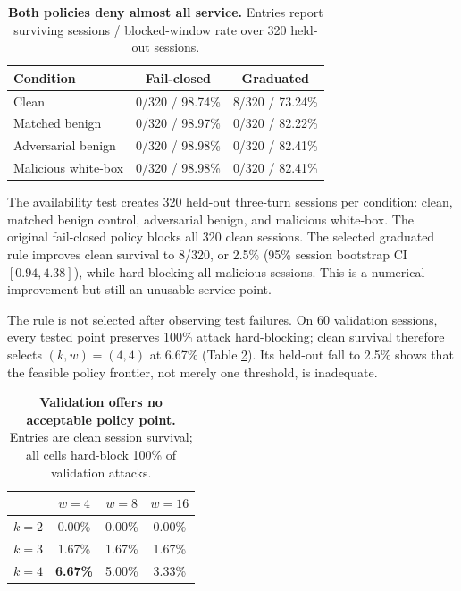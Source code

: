 \documentclass[sigconf]{acmart}
\begin{document}
\begin{table}[t]
\caption{\textbf{Both policies deny almost all service.} Entries report
surviving sessions / blocked-window rate over 320 held-out sessions.}
\label{tab:availability}
\centering\small
\begin{tabularx}{\columnwidth}{@{}lcc@{}}
\toprule
Condition & Fail-closed & Graduated \\
\midrule
\rowcolor{SGPale}Clean & 0/320 / 98.74\% & 8/320 / 73.24\% \\
Matched benign & 0/320 / 98.97\% & 0/320 / 82.22\% \\
Adversarial benign & 0/320 / 98.98\% & 0/320 / 82.41\% \\
Malicious white-box & 0/320 / 98.98\% & 0/320 / 82.41\% \\
\bottomrule
\end{tabularx}
\end{table}

The availability test creates 320 held-out three-turn sessions per condition:
clean, matched benign control, adversarial benign, and malicious white-box. The
original fail-closed policy blocks all 320 clean sessions. The selected
graduated rule improves clean survival to 8/320, or 2.5\% (95\% session
bootstrap CI $[0.94,4.38]$), while hard-blocking all malicious sessions. This
is a numerical improvement but still an unusable service point.

The rule is not selected after observing test failures. On 60 validation
sessions, every tested point preserves 100\% attack hard-blocking; clean
survival therefore selects $(k,w)=(4,4)$ at 6.67\% (Table
\ref{tab:policy-grid}). Its held-out fall to 2.5\% shows that the feasible
policy frontier, not merely one threshold, is inadequate.

\begin{table}[t]
\caption{\textbf{Validation offers no acceptable policy point.} Entries are
clean session survival; all cells hard-block 100\% of validation attacks.}
\label{tab:policy-grid}
\centering\small
\begin{tabular}{@{}lccc@{}}
\toprule
 & $w=4$ & $w=8$ & $w=16$ \\
\midrule
$k=2$ & 0.00\% & 0.00\% & 0.00\% \\
$k=3$ & 1.67\% & 1.67\% & 1.67\% \\
$k=4$ & \cellcolor{SGGreen}\textbf{6.67\%} & 5.00\% & 3.33\% \\
\bottomrule
\end{tabular}
\end{table}
\end{document}
